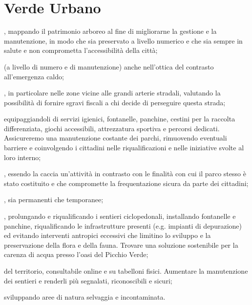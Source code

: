 \section{Verde Urbano}
, mappando il patrimonio arboreo al fine di migliorarne la gestione e la manutenzione, in modo che sia preservato a livello numerico e che sia sempre in salute e non comprometta l'accessibilità della città;

 (a livello di numero e di manutenzione) anche nell'ottica del contrasto all'emergenza caldo;  

, in particolare nelle zone vicine alle grandi arterie stradali, valutando la possibilità di fornire sgravi fiscali a chi decide di perseguire questa strada; 

 equipaggiandoli di servizi igienici, fontanelle, panchine, cestini per la raccolta differenziata, giochi accessibili, attrezzatura sportiva e percorsi dedicati. Assicureremo una manutenzione costante dei parchi, rimuovendo eventuali barriere e coinvolgendo i cittadini nelle riqualificazioni e nelle iniziative svolte al loro interno; 

, essendo la caccia un'attività in contrasto con le finalità con cui il parco stesso è stato costituito e che compromette la frequentazione sicura da parte dei cittadini; 

, sia permanenti che temporanee; 

, prolungando e riqualificando i sentieri ciclopedonali, installando fontanelle e panchine, riqualificando le infrastrutture presenti (e.g. impianti di depurazione) ed evitando interventi antropici eccessivi che limitino lo sviluppo e la preservazione della flora e della fauna. Trovare una soluzione sostenibile per la carenza di acqua presso l'oasi del Picchio Verde; 

 del territorio, consultabile online e su tabelloni fisici. Aumentare la manutenzione dei sentieri e renderli più segnalati, riconoscibili e sicuri;

 sviluppando aree di natura selvaggia e incontaminata.
